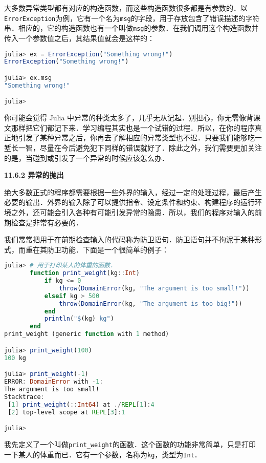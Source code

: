 大多数异常类型都有对应的构造函数，而这些构造函数很多都是有参数的．以\verb|ErrorException|为例，它有一个名为\verb|msg|的字段，用于存放包含了错误描述的字符串．相应的，它的构造函数也有一个叫做\verb|msg|的参数．在我们调用这个构造函数并传入一个参数值之后，其结果值就会是这样的：

\begin{lstlisting}[language=julia]
julia> ex = ErrorException("Something wrong!")
ErrorException("Something wrong!")

julia> ex.msg
"Something wrong!"

julia> 
\end{lstlisting}

你可能会觉得 Julia 中异常的种类太多了，几乎无从记起．别担心，你无需像背课文那样把它们都记下来．学习编程其实也是一个试错的过程．所以，在你的程序真正地引发了某种异常之后，你再去了解相应的异常类型也不迟．只要我们能够吃一堑长一智，尽量在今后避免犯下同样的错误就好了．除此之外，我们需要更加关注的是，当碰到或引发了一个异常的时候应该怎么办．

\textbf{11.6.2 异常的抛出}

绝大多数正式的程序都需要根据一些外界的输入，经过一定的处理过程，最后产生必要的输出．外界的输入除了可以提供指令、设定条件和约束、构建程序的运行环境之外，还可能会引入各种有可能引发异常的隐患．所以，我们的程序对输入的前期检查是非常有必要的．

我们常常把用于在前期检查输入的代码称为防卫语句．防卫语句并不拘泥于某种形式，而重在其防卫功能．下面是一个很简单的例子：

\begin{lstlisting}[language=julia]
julia> # 用于打印某人的体重的函数．
       function print_weight(kg::Int)
           if kg <= 0
               throw(DomainError(kg, "The argument is too small!"))
           elseif kg > 500 
               throw(DomainError(kg, "The argument is too big!"))
           end
           println("$(kg) kg")
       end
print_weight (generic function with 1 method)

julia> print_weight(100)
100 kg

julia> print_weight(-1)
ERROR: DomainError with -1:
The argument is too small!
Stacktrace:
 [1] print_weight(::Int64) at ./REPL[1]:4
 [2] top-level scope at REPL[3]:1

julia> 
\end{lstlisting}

我先定义了一个叫做\verb|print_weight|的函数．这个函数的功能非常简单，只是打印一下某人的体重而已．它有一个参数，名称为\verb|kg|，类型为\verb|Int|．

